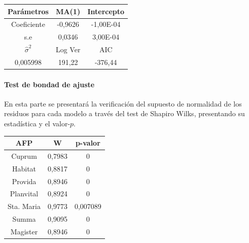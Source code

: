 \begin{center}
\begin{tabular}{|l|l|l|}
\hline
\multicolumn{1}{|c|}{Par\'ametros} & \multicolumn{1}{c|}{MA(1)} & \multicolumn{1}{c|}{Intercepto} \\
\hline
\multicolumn{1}{|c|}{Coeficiente} & \multicolumn{1}{c|}{-0,9626} & \multicolumn{1}{c|}{-1,00E-04} \\
\hline
\multicolumn{1}{|c|}{s.e} & \multicolumn{1}{c|}{0,0346} & \multicolumn{1}{c|}{3,00E-04} \\
\hline
\multicolumn{1}{|c|}{$\hat{\sigma}^{2}$} & \multicolumn{1}{c|}{Log Ver} & \multicolumn{1}{c|}{AIC} \\
\hline
\multicolumn{1}{|c|}{0,005998} & \multicolumn{1}{c|}{191,22} & \multicolumn{1}{c|}{-376,44} \\
\hline
\end{tabular}
\end{center}

\paragraph{Test de bondad de ajuste}

En esta parte se presentar\'a la verificaci\'on del supuesto de normalidad de los residuos para cada modelo a trav\'es del test de Shapiro Wilks, presentando su estad\'istica y el valor-$p$.
\begin{center}
\begin{tabular}{|l|l|l|}
\hline
\multicolumn{1}{|c|}{AFP} & \multicolumn{1}{c|}{W} & \multicolumn{1}{c|}{p-valor} \\
\hline
\multicolumn{1}{|c|}{Cuprum} & \multicolumn{1}{c|}{0,7983} & \multicolumn{1}{c|}{0} \\
\hline
\multicolumn{1}{|c|}{Habitat} & \multicolumn{1}{c|}{0,8817} & \multicolumn{1}{c|}{0} \\
\hline
\multicolumn{1}{|c|}{Provida} & \multicolumn{1}{c|}{0,8946} & \multicolumn{1}{c|}{0} \\
\hline
\multicolumn{1}{|c|}{Planvital} & \multicolumn{1}{c|}{0,8924} & \multicolumn{1}{c|}{0} \\
\hline
\multicolumn{1}{|c|}{Sta. Maria} & \multicolumn{1}{c|}{0,9773} & \multicolumn{1}{c|}{0,007089} \\
\hline
\multicolumn{1}{|c|}{Summa} & \multicolumn{1}{c|}{0,9095} & \multicolumn{1}{c|}{0} \\
\hline
\multicolumn{1}{|c|}{Magister} & \multicolumn{1}{c|}{0,8946} & \multicolumn{1}{c|}{0} \\
\hline
\end{tabular}
\end{center}

